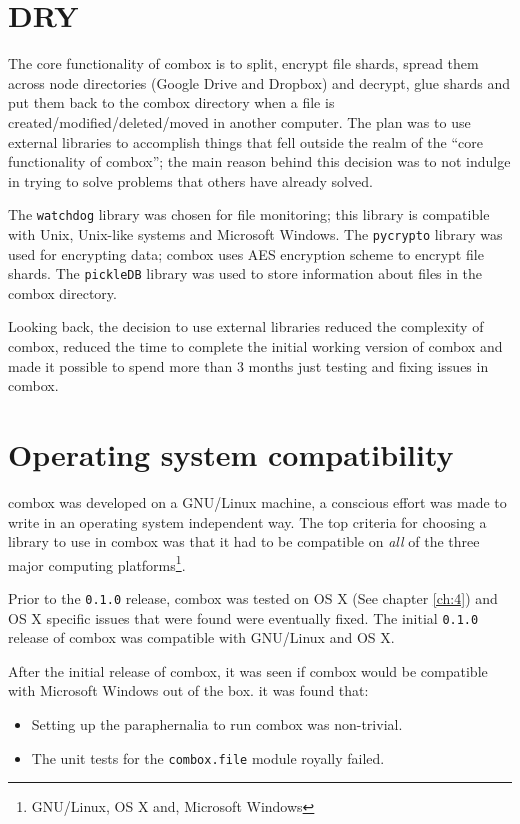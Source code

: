 \section{DRY}

The core functionality of combox is to split, encrypt file shards,
spread them across node directories (Google Drive and Dropbox) and
decrypt, glue shards and put them back to the combox directory when a
file is created/modified/deleted/moved in another computer. The plan
was to use external libraries to accomplish things that fell outside
the realm of the ``core functionality of combox''; the main reason
behind this decision was to not indulge in trying to solve problems
that others have already solved.

The \verb+watchdog+\cite{pylib:watchdog} library was chosen for file
monitoring; this library is compatible with Unix, Unix-like systems
and Microsoft Windows. The \verb+pycrypto+
library\cite{pylib:pycrypto} was used for encrypting data; combox uses
AES encryption scheme to encrypt file shards. The
\verb+pickleDB+\cite{pylib:pickledb} library was used to store
information about files in the combox directory.

Looking back, the decision to use external libraries reduced the
complexity of combox, reduced the time to complete the initial working
version of combox and made it possible to spend more than 3 months
just testing and fixing issues in combox.

\section{Operating system compatibility}\label{3-os-compat}

combox was developed on a GNU/Linux machine, a conscious effort was
made to write in an operating system independent way. The top criteria
for choosing a library to use in combox was that it had to be
compatible on \emph{all} of the three major computing
platforms\footnote{GNU/Linux, OS X and, Microsoft Windows}.

Prior to the \verb+0.1.0+ release, combox was tested on OS X (See
chapter \ref{ch:4}) and OS X specific issues that were found were
eventually fixed. The initial \verb+0.1.0+ release of combox was
compatible with GNU/Linux and OS X.

After the initial release of combox, it was seen if combox would be
compatible with Microsoft Windows out of the box. it was found that:

\begin{itemize}
\item Setting up the paraphernalia to run combox was
  non-trivial\cite{doc:combox-setup-windoze}.
\item The unit tests for the \verb+combox.file+ module royally failed.
\end{itemize}

